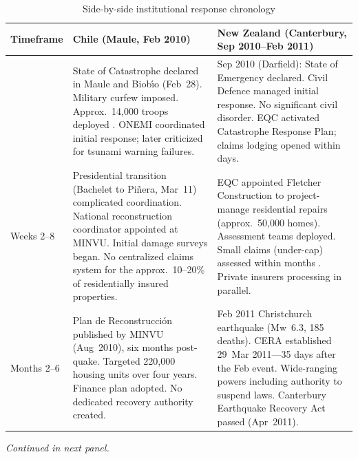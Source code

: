 \begin{table}[!htbp]
\centering
\caption{Side-by-side institutional response chronology}
\label{tab:chronology}
\footnotesize
\begin{tabular}{@{}
  >{\raggedright\arraybackslash}p{}
  >{\raggedright\arraybackslash}p{}
  >{\raggedright\arraybackslash}p{}
@{}}
\toprule
\textbf{Timeframe} &
\textbf{Chile (Maule, Feb 2010)} &
\textbf{New Zealand (Canterbury, Sep 2010--Feb 2011)} \\
\midrule

{Days 1--7} &
State of Catastrophe declared in Maule and Biob{\'{\i}}o (Feb~28). Military curfew imposed. Approx.\ 14,000 troops deployed \parencite{CRS2010}. ONEMI coordinated initial response; later criticized for tsunami warning failures. &
Sep 2010 (Darfield): State of Emergency declared. Civil Defence managed initial response. No significant civil disorder. EQC activated Catastrophe Response Plan; claims lodging opened within days. \\
\addlinespace

{Weeks 2--8} &
Presidential transition (Bachelet to Pi{\~n}era, Mar~11) complicated coordination. National reconstruction coordinator appointed at MINVU. Initial damage surveys began. No centralized claims system for the approx.\ 10--20\% of residentially insured properties. &
EQC appointed Fletcher Construction to project-manage residential repairs (approx.\ 50,000 homes). Assessment teams deployed. Small claims (under-cap) assessed within months \parencite{Khakurel2021}. Private insurers processing in parallel. \\
\addlinespace

{Months 2--6} &
Plan de Reconstrucci{\'o}n published by MINVU (Aug~2010), six months post-quake. Targeted 220,000 housing units over four years. Finance plan adopted. No dedicated recovery authority created. &
Feb 2011 Christchurch earthquake (Mw~6.3, 185 deaths). CERA established 29~Mar 2011---35 days after the Feb event. Wide-ranging powers including authority to suspend laws. Canterbury Earthquake Recovery Act passed (Apr~2011). \\

\bottomrule
\end{tabular}

\vspace{2pt}
{\scriptsize\textit{Continued in next panel.}}
\end{table}

